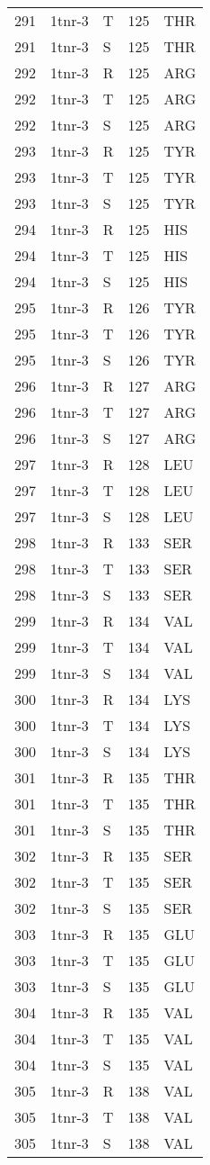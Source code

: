 \begin{tiny}
\begin{longtable}[l]{l|l|l|l|l}
	291 & 1tnr-3 & T & 125 & THR \\
	291 & 1tnr-3 & S & 125 & THR \\
	292 & 1tnr-3 & R & 125 & ARG \\
	292 & 1tnr-3 & T & 125 & ARG \\
	292 & 1tnr-3 & S & 125 & ARG \\
	293 & 1tnr-3 & R & 125 & TYR \\
	293 & 1tnr-3 & T & 125 & TYR \\
	293 & 1tnr-3 & S & 125 & TYR \\
	294 & 1tnr-3 & R & 125 & HIS \\
	294 & 1tnr-3 & T & 125 & HIS \\
	294 & 1tnr-3 & S & 125 & HIS \\
	295 & 1tnr-3 & R & 126 & TYR \\
	295 & 1tnr-3 & T & 126 & TYR \\
	295 & 1tnr-3 & S & 126 & TYR \\
	296 & 1tnr-3 & R & 127 & ARG \\
	296 & 1tnr-3 & T & 127 & ARG \\
	296 & 1tnr-3 & S & 127 & ARG \\
	297 & 1tnr-3 & R & 128 & LEU \\
	297 & 1tnr-3 & T & 128 & LEU \\
	297 & 1tnr-3 & S & 128 & LEU \\
	298 & 1tnr-3 & R & 133 & SER \\
	298 & 1tnr-3 & T & 133 & SER \\
	298 & 1tnr-3 & S & 133 & SER \\
	299 & 1tnr-3 & R & 134 & VAL \\
	299 & 1tnr-3 & T & 134 & VAL \\
	299 & 1tnr-3 & S & 134 & VAL \\
	300 & 1tnr-3 & R & 134 & LYS \\
	300 & 1tnr-3 & T & 134 & LYS \\
	300 & 1tnr-3 & S & 134 & LYS \\
	301 & 1tnr-3 & R & 135 & THR \\
	301 & 1tnr-3 & T & 135 & THR \\
	301 & 1tnr-3 & S & 135 & THR \\
	302 & 1tnr-3 & R & 135 & SER \\
	302 & 1tnr-3 & T & 135 & SER \\
	302 & 1tnr-3 & S & 135 & SER \\
	303 & 1tnr-3 & R & 135 & GLU \\
	303 & 1tnr-3 & T & 135 & GLU \\
	303 & 1tnr-3 & S & 135 & GLU \\
	304 & 1tnr-3 & R & 135 & VAL \\
	304 & 1tnr-3 & T & 135 & VAL \\
	304 & 1tnr-3 & S & 135 & VAL \\
	305 & 1tnr-3 & R & 138 & VAL \\
	305 & 1tnr-3 & T & 138 & VAL \\
	305 & 1tnr-3 & S & 138 & VAL \\
\end{longtable}
\end{tiny}